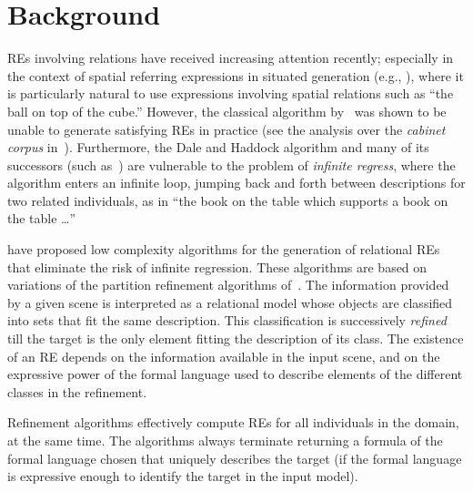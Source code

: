 \section{Background} \label{background}

REs involving relations have
received increasing attention recently; especially in the context of
spatial referring expressions in situated generation (e.g., \cite{kelleher06:_increm_gener_of_spatial_refer}), where it is
particularly natural to use expressions involving spatial relations such as ``the ball on top of the cube.''  However, the classical algorithm by~ was shown to be unable to generate satisfying REs in practice (see the 
analysis over the \emph{cabinet corpus} in~\cite{viethen06:_algor_for_gener_refer_expres}).  Furthermore, the Dale
and Haddock algorithm and many of its successors (such as~\cite{kelleher06:_increm_gener_of_spatial_refer}) are vulnerable to
the problem of \emph{infinite regress}, where the algorithm enters an infinite loop, jumping back
and forth between descriptions for two related individuals, as in ``the book on the table which supports a book on the
table \ldots''

 have proposed low complexity algorithms for the generation 
of relational REs 
that eliminate the risk of infinite regression. 
These algorithms are based on variations of the partition refinement algorithms of~.
The information provided by a given scene is interpreted as a relational model whose 
objects are classified into sets that fit the same description.  
This classification is successively \emph{refined}  till the target 
is the only element fitting the description of its class.  The existence of an RE 
depends on the information available in the input scene, and on the expressive power of the formal 
language used to describe elements of the different classes in the refinement. 

Refinement algorithms %
effectively compute REs for all individuals in the domain, at the same time. The algorithms always terminate returning a formula of 
the formal language chosen that uniquely describes the target (if the 
formal language is expressive enough to identify the target in the input model). 

